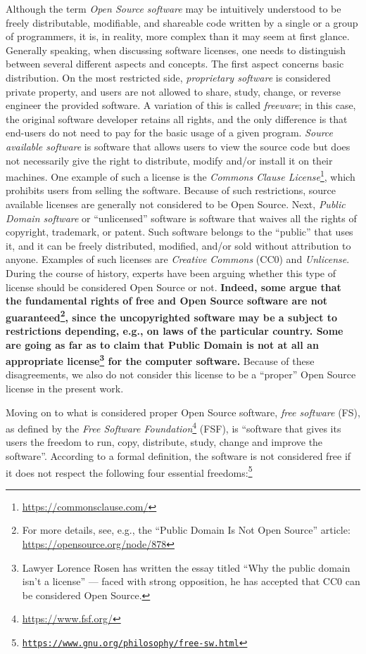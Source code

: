\documentclass[twocolumn]{openjournal}
\begin{document}
Although the term \textit{Open Source software} may be intuitively understood
to be freely distributable, modifiable, and shareable code written by a single
or a group of programmers, it is, in reality, more complex than it may seem at
first glance. Generally speaking, when discussing software licenses, one needs
to distinguish between several different aspects and concepts. The first aspect
concerns basic distribution. On the most restricted side, \emph{proprietary
software} is considered private property, and users are not allowed to share,
study, change, or reverse engineer the provided software. A variation of this
is called \emph{freeware}; in this case, the original software developer
retains all rights, and the only difference is that end-users do not need to
pay for the basic usage of a given program. \textit{Source available software}
is software that allows users to view the source code but does not necessarily
give the right to distribute, modify and/or install it on their machines. One
example of such a license is the \textit{Commons Clause
License}\footnote{\url{https://commonsclause.com/}}, which prohibits users from
selling the software. Because of such restrictions, source available licenses
are generally not considered to be Open Source. Next, \textit{Public Domain
software} or ``unlicensed'' software is software that waives all the rights of
copyright, trademark, or patent. Such software belongs to the ``public'' that
uses it, and it can be freely distributed, modified, and/or sold without
attribution to anyone. Examples of such licenses are \textit{Creative Commons}
(CC0) and \textit{Unlicense}. During the course of history, experts have been
arguing whether this type of license should be considered Open Source or
not. \textbf{Indeed, some argue that the fundamental rights of free and Open Source software are not guaranteed\footnote{For more details, see, e.g., the “Public Domain Is Not Open Source” article: \url{https://opensource.org/node/878}}, since the uncopyrighted software may be a subject to restrictions depending, e.g., on laws of the particular country. Some are going as far as to claim that Public Domain is not at all an appropriate license\footnote{Lawyer Lorence Rosen has written the essay titled ``Why the public domain isn't a license'' --- faced with strong opposition, he has accepted that CC0 can be considered Open Source.} for the computer software.} Because of these disagreements, we also do not consider this license to be a ``proper'' Open Source license in the present work.

Moving on to what is considered proper Open Source software, \textit{free
software} (FS), as defined by the \textit{Free Software
Foundation}\footnote{\url{https://www.fsf.org/}} (FSF), is ``software that
gives its users the freedom to run, copy, distribute, study, change and improve
the software''.  According to a formal definition, the software is not
considered free if it does not respect the following four essential
freedoms:\footnote{\href{https://www.gnu.org/philosophy/free-sw.html}
{\texttt{https://www.gnu.org/philosophy/free-sw.html}}}
\end{document}
